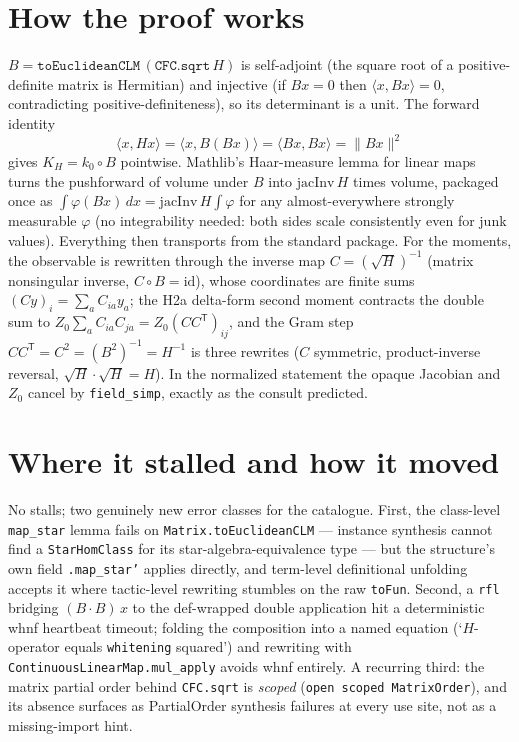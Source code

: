 \documentclass[11pt]{article}
\begin{document}
\section{How the proof works}

$B = \texttt{toEuclideanCLM}\,(\texttt{CFC.sqrt}\,H)$ is
self-adjoint (the square root of a positive-definite matrix is
Hermitian) and injective (if $Bx = 0$ then
$\langle x, Bx\rangle = 0$, contradicting positive-definiteness), so
its determinant is a unit. The forward identity
\[
\langle x, Hx\rangle
= \langle x, B(Bx)\rangle
= \langle Bx, Bx\rangle = \|Bx\|^2
\]
gives $K_H = k_0 \circ B$ pointwise. Mathlib's Haar-measure lemma
for linear maps turns the pushforward of volume under $B$ into
$\mathrm{jacInv}\,H$ times volume, packaged once as
$\int \varphi(Bx)\,dx = \mathrm{jacInv}\,H \int \varphi$ for any
almost-everywhere strongly measurable $\varphi$ (no integrability
needed: both sides scale consistently even for junk values).
Everything then transports from the standard package. For the
moments, the observable is rewritten through the inverse map
$C = (\sqrt H)^{-1}$ (matrix nonsingular inverse, $C \circ B =
\mathrm{id}$), whose coordinates are finite sums
$(Cy)_i = \sum_a C_{ia} y_a$; the H2a delta-form second moment
contracts the double sum to
$Z_0 \sum_a C_{ia} C_{ja} = Z_0 (CC^{\mathsf T})_{ij}$, and the Gram
step $CC^{\mathsf T} = C^2 = (B^2)^{-1} = H^{-1}$ is three rewrites
($C$ symmetric, product-inverse reversal, $\sqrt H \cdot \sqrt H =
H$). In the normalized statement the opaque Jacobian and $Z_0$
cancel by \texttt{field\_simp}, exactly as the consult predicted.

\section{Where it stalled and how it moved}

No stalls; two genuinely new error classes for the catalogue. First,
the class-level \texttt{map\_star} lemma fails on
\texttt{Matrix.toEuclideanCLM} --- instance synthesis cannot find a
\texttt{StarHomClass} for its star-algebra-equivalence type --- but
the structure's own field \texttt{.map\_star'} applies directly, and
term-level definitional unfolding accepts it where tactic-level
rewriting stumbles on the raw \texttt{toFun}. Second, a \texttt{rfl}
bridging $(B \cdot B)\,x$ to the def-wrapped double application hit
a deterministic whnf heartbeat timeout; folding the composition into
a named equation (`$H$-operator equals \texttt{whitening} squared')
and rewriting with \texttt{ContinuousLinearMap.mul\_apply} avoids
whnf entirely. A recurring third: the matrix partial order behind
\texttt{CFC.sqrt} is \emph{scoped} (\texttt{open scoped
MatrixOrder}), and its absence surfaces as PartialOrder synthesis
failures at every use site, not as a missing-import hint.
\end{document}
